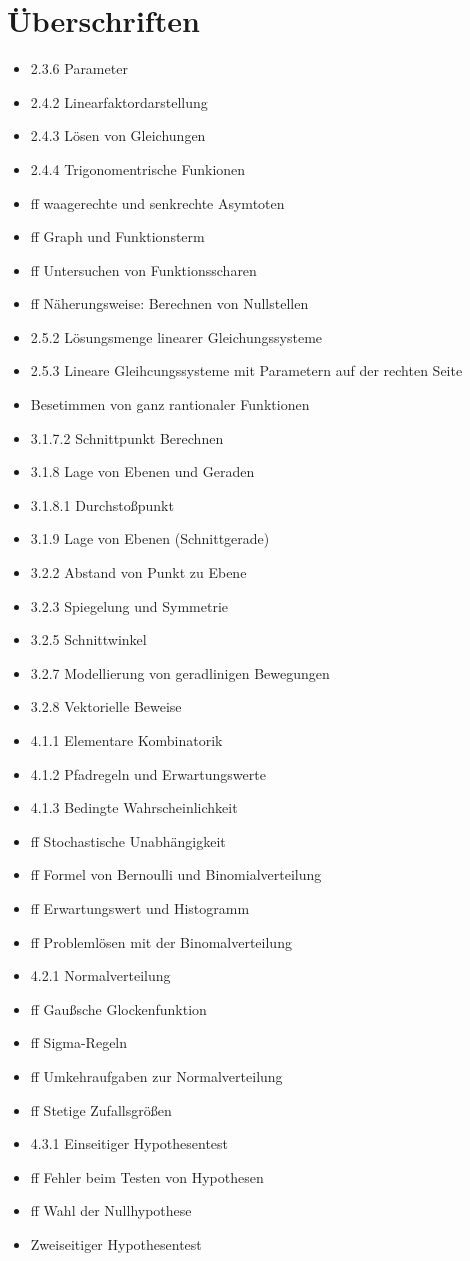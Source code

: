 \section{Überschriften}
\begin{itemize}
    \item 2.3.6 Parameter
    \item 2.4.2 Linearfaktordarstellung
    \item 2.4.3 Lösen von Gleichungen
    \item 2.4.4 Trigonomentrische Funkionen
    \item ff waagerechte und senkrechte Asymtoten
    \item ff Graph und Funktionsterm
    \item ff Untersuchen von Funktionsscharen
    \item ff Näherungsweise: Berechnen von Nullstellen
    \item 2.5.2 Lösungsmenge linearer Gleichungssysteme
    \item 2.5.3 Lineare Gleihcungssysteme mit Parametern auf der rechten Seite
    \item Besetimmen von ganz rantionaler Funktionen
    \item 3.1.7.2 Schnittpunkt Berechnen
    \item 3.1.8 Lage von Ebenen und Geraden
    \item 3.1.8.1 Durchstoßpunkt
    \item 3.1.9 Lage von Ebenen (Schnittgerade)
    \item 3.2.2 Abstand von Punkt zu Ebene
    \item 3.2.3 Spiegelung und Symmetrie
    \item 3.2.5 Schnittwinkel
    \item 3.2.7 Modellierung von geradlinigen Bewegungen
    \item 3.2.8 Vektorielle Beweise
    \item 4.1.1 Elementare Kombinatorik
    \item 4.1.2 Pfadregeln und Erwartungswerte
    \item 4.1.3 Bedingte Wahrscheinlichkeit
    \item ff Stochastische Unabhängigkeit
    \item ff Formel von Bernoulli und Binomialverteilung
    \item ff Erwartungswert und Histogramm
    \item ff Problemlösen mit der Binomalverteilung
    \item 4.2.1 Normalverteilung
    \item ff Gaußsche Glockenfunktion
    \item ff Sigma-Regeln
    \item ff Umkehraufgaben zur Normalverteilung
    \item ff Stetige Zufallsgrößen 
    \item 4.3.1 Einseitiger Hypothesentest
    \item ff Fehler beim Testen von Hypothesen
    \item ff Wahl der Nullhypothese
    \item Zweiseitiger Hypothesentest
\end{itemize}

